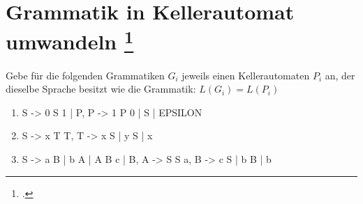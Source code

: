 \documentclass{lehramt-informatik-aufgabe}
\begin{document}
\section{Grammatik in Kellerautomat umwandeln
\footcite[Aufgabe 5: Grammatik in Kellerautomat umwandeln]{theo:ab:2}}

Gebe für die folgenden Grammatiken $G_i$ jeweils einen Kellerautomaten
$P_i$ an, der dieselbe Sprache besitzt wie die Grammatik: $L(G_i) =
L(P_i)$

\begin{enumerate}


\item

\begin{liProduktionsRegeln}[P_1]
S -> 0 S 1 | P,
P -> 1 P 0 | S | EPSILON
\end{liProduktionsRegeln}

\begin{liAntwort}
\begin{center}
\end{center}

\end{liAntwort}


\item

\begin{liProduktionsRegeln}[P_2]
S -> x T T,
T -> x S | y S | x
\end{liProduktionsRegeln}


\item

\begin{liProduktionsRegeln}[P_3]
S -> a B | b A | A B c | B,
A -> S S a,
B -> c S | b B | b
\end{liProduktionsRegeln}
\end{enumerate}
\end{document}
